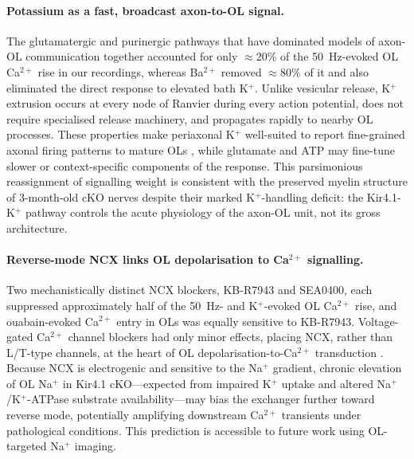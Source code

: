 \documentclass[11pt,a4paper]{article}
\begin{document}
\paragraph{Potassium as a fast, broadcast axon-to-OL signal.} The glutamatergic and purinergic pathways that have dominated models of axon-OL communication \citep{Micu2006,Saab2016,Kettenmann2013} together accounted for only $\approx$20\% of the 50~Hz-evoked OL Ca$^{2+}$ rise in our recordings, whereas Ba$^{2+}$ removed $\approx$80\% of it and also eliminated the direct response to elevated bath K$^+$. Unlike vesicular release, K$^+$ extrusion occurs at every node of Ranvier during every action potential, does not require specialised release machinery, and propagates rapidly to nearby OL processes. These properties make periaxonal K$^+$ well-suited to report fine-grained axonal firing patterns to mature OLs \citep{Bay2012,Larson2018,Olsen2015}, while glutamate and ATP may fine-tune slower or context-specific components of the response. This parsimonious reassignment of signalling weight is consistent with the preserved myelin structure of 3-month-old cKO nerves despite their marked K$^+$-handling deficit: the Kir4.1-K$^+$ pathway controls the acute physiology of the axon-OL unit, not its gross architecture.

\paragraph{Reverse-mode NCX links OL depolarisation to Ca$^{2+}$ signalling.} Two mechanistically distinct NCX blockers, KB-R7943 and SEA0400, each suppressed approximately half of the 50~Hz- and K$^+$-evoked OL Ca$^{2+}$ rise, and ouabain-evoked Ca$^{2+}$ entry in OLs was equally sensitive to KB-R7943. Voltage-gated Ca$^{2+}$ channel blockers had only minor effects, placing NCX, rather than L/T-type channels, at the heart of OL depolarisation-to-Ca$^{2+}$ transduction \citep{Stys1992,Micu2018}. Because NCX is electrogenic and sensitive to the Na$^+$ gradient, chronic elevation of OL Na$^+$ in Kir4.1 cKO---expected from impaired K$^+$ uptake and altered Na$^+$/K$^+$-ATPase substrate availability---may bias the exchanger further toward reverse mode, potentially amplifying downstream Ca$^{2+}$ transients under pathological conditions. This prediction is accessible to future work using OL-targeted Na$^+$ imaging.
\end{document}
